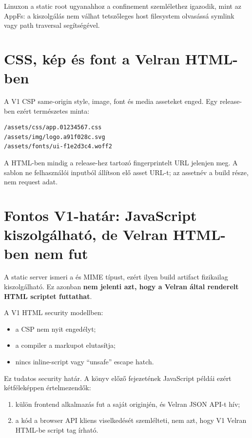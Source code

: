 Linuxon a static root ugyanahhoz a confinement szemlélethez igazodik, mint az AppFs: a kiszolgálás nem válhat tetszőleges host filesystem olvasássá symlink vagy path traversal segítségével.

\section{CSS, kép és font a Velran HTML-ben}

A V1 CSP same-origin style, image, font és media asseteket enged. Egy release-ben ezért természetes minta:

\begin{lstlisting}
/assets/css/app.01234567.css
/assets/img/logo.a91f028c.svg
/assets/fonts/ui-f1e2d3c4.woff2
\end{lstlisting}

A HTML-ben mindig a release-hez tartozó fingerprintelt URL jelenjen meg. A sablon ne felhasználói inputból állítson elő asset URL-t; az assetnév a build része, nem request adat.

\section{Fontos V1-határ: JavaScript kiszolgálható, de Velran HTML-ben nem fut}

A static server ismeri a  és  MIME típust, ezért ilyen build artifact fizikailag kiszolgálható. Ez azonban \textbf{nem jelenti azt, hogy a Velran által renderelt HTML scriptet futtathat}.

A V1 HTML security modellben:

\begin{itemize}
  \item a CSP nem nyit  engedélyt;
  \item a compiler a  markupot elutasítja;
  \item nincs inline-script vagy ``unsafe'' escape hatch.
\end{itemize}

Ez tudatos security határ. A könyv előző fejezetének JavaScript  példái ezért kétféleképpen értelmezendők:

\begin{enumerate}
  \item külön frontend alkalmazás fut a saját originjén, és Velran JSON API-t hív;
  \item a kód a browser API kliens viselkedését szemlélteti, nem azt, hogy V1 Velran HTML-be script tag írható.
\end{enumerate}

